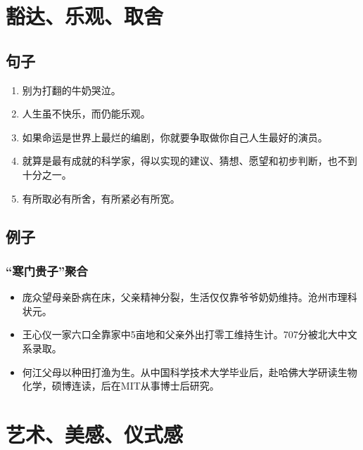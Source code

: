 \section{豁达、乐观、取舍}
\subsection{句子}
\begin{enumerate}
\item 别为打翻的牛奶哭泣。
\item 人生虽不快乐，而仍能乐观。
\item 如果命运是世界上最烂的编剧，你就要争取做你自己人生最好的演员。
\item 就算是最有成就的科学家，得以实现的建议、猜想、愿望和初步判断，也不到十分之一。
\item 有所取必有所舍，有所紧必有所宽。
\end{enumerate}
\subsection{例子}
\subsubsection{“寒门贵子”聚合}
\begin{itemize}
\item 庞众望\hspace{3ex}母亲卧病在床，父亲精神分裂，生活仅仅靠爷爷奶奶维持。沧州市理科状元。
\item 王心仪\hspace{3ex}一家六口全靠家中5亩地和父亲外出打零工维持生计。707分被北大中文系录取。
\item 何江\hspace{3ex}父母以种田打渔为生。从中国科学技术大学毕业后，赴哈佛大学研读生物化学，硕博连读，后在MIT从事博士后研究。
\end{itemize}

\section{艺术、美感、仪式感}
